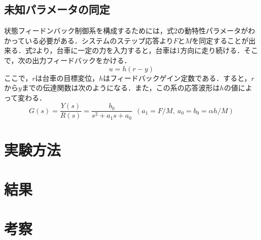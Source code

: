 \documentclass[11pt,a4paper]{jsarticle}
\begin{document}
  \subsection{未知パラメータの同定}
  状態フィードンバック制御系を構成するためには，式2の動特性パラメータがわかっている必要がある．システムのステップ応答より$F$と$M$を同定することが出来る．式2より，台車に一定の力を入力すると，台車は1方向に走り続ける．そこで，次の出力フィードバックをかける．
  \begin{equation}
   u = h(r-y)
  \end{equation}
  ここで，$r$は台車の目標変位，$h$はフィードバックゲイン定数である．すると，$r$から$y$までの伝達関数は次のようになる．また，この系の応答波形は$h$の値によって変わる．
  \begin{equation}
 G(s) = \frac{Y(s)}{R(s)} = \frac{b_0}{s^2+a_1 s +a_0} \ \ (a_1 = F/M,\ a_0 = b_0 = \alpha h/M)
  \end{equation}
\section{実験方法}

\section{結果}

\section{考察}
\end{document}
